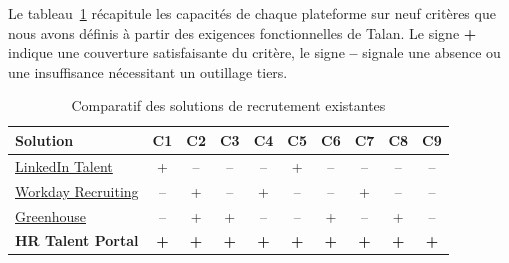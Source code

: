 Le tableau~\ref{tab:tab-existant} récapitule les capacités de chaque plateforme sur neuf critères que nous avons définis à partir des exigences fonctionnelles de Talan. Le signe \textbf{+} indique une couverture satisfaisante du critère, le signe \textbf{--} signale une absence ou une insuffisance nécessitant un outillage tiers.

\begin{table}[ht]
  \begin{center}
    \begin{tabular}{|l|c|c|c|c|c|c|c|c|c|}
      \hline
      \textbf{Solution} & \textbf{C1} & \textbf{C2} & \textbf{C3} & \textbf{C4} & \textbf{C5} & \textbf{C6} & \textbf{C7} & \textbf{C8} & \textbf{C9} \\
      \hline
      \hyperlink{LinkedIn Talent}{LinkedIn Talent} & + & -- & -- & -- & + & -- & -- & -- & -- \\
      \hline
      \hyperlink{Workday}{Workday Recruiting} & -- & + & -- & + & -- & -- & + & -- & -- \\
      \hline
      \hyperlink{Greenhouse}{Greenhouse} & -- & + & + & -- & -- & + & -- & + & -- \\
      \hline
      \textbf{HR Talent Portal} & \textbf{+} & \textbf{+} & \textbf{+} & \textbf{+} & \textbf{+} & \textbf{+} & \textbf{+} & \textbf{+} & \textbf{+} \\
      \hline
    \end{tabular}
    \caption{Comparatif des solutions de recrutement existantes}
    \label{tab:tab-existant}
  \end{center}
\end{table}
\FloatBarrier

